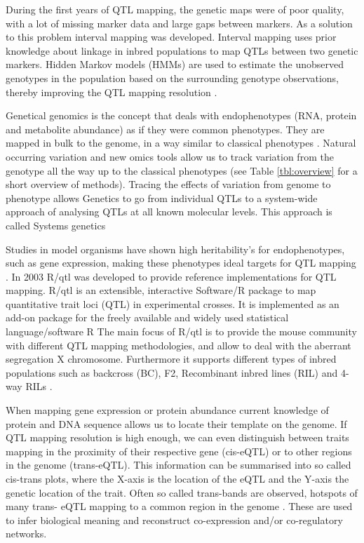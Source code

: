 During the first years of QTL mapping, the genetic maps were of poor quality, with a lot of missing marker data and large 
gaps between markers. As a solution to this problem interval mapping was developed. Interval mapping uses prior knowledge 
about linkage in inbred populations to map QTLs between two genetic markers. Hidden Markov models (HMMs) are used to estimate 
the unobserved genotypes in the population based on the surrounding genotype observations, thereby improving the QTL 
mapping resolution \cite{Jansen:1993, Zeng:1994}.

Genetical genomics is the concept that deals with endophenotypes (RNA, protein and metabolite abundance) as if they were 
common phenotypes. They are mapped in bulk to the genome, in a way similar to classical phenotypes \cite{Jansen:2001a}. 
Natural occurring variation and new omics tools allow us to track variation from the genotype all the way up to the classical 
phenotypes (see Table \ref{tbl:overview} for a short overview of methods). Tracing the effects of variation from genome 
to phenotype allows Genetics to go from individual QTLs to a system-wide approach of analysing QTLs at all known molecular 
levels. This approach is called Systems genetics \cite{Threadgill:2006, Nadeau:2011}

Studies in model organisms have shown high heritability's for endophenotypes, such as gene expression, making these phenotypes 
ideal targets for QTL mapping \cite{Brem:2002, Yvert:2003, Morley:2004}. In 2003 R/qtl was developed to provide reference 
implementations for QTL mapping. R/qtl is an extensible, interactive Software/R package to map quantitative trait loci (QTL) 
in experimental crosses. It is implemented as an add-on package for the freely available and widely used statistical 
language/software R \cite{R:2009} The main focus of R/qtl is to provide the mouse community with different QTL mapping 
methodologies, and allow to deal with the aberrant segregation X chromosome. Furthermore it supports different types of 
inbred populations such as backcross (BC), F2, Recombinant inbred lines (RIL) and 4-way RILs \cite{Broman:2003}.

When mapping gene expression or protein abundance current knowledge of protein and DNA sequence allows us to locate their 
template on the genome. If QTL mapping resolution is high enough, we can even distinguish between traits mapping in the 
proximity of their respective gene (cis-eQTL) or to other regions in the genome (trans-eQTL). This information can be summarised 
into so called cis-trans plots, where the X-axis is the location of the eQTL and the Y-axis the genetic location of the trait. 
Often so called trans-bands are observed, hotspots of many trans- eQTL mapping to a common region in the genome \cite{Breitling:2008a}. 
These are used to infer biological meaning and reconstruct co-expression and/or co-regulatory networks.

